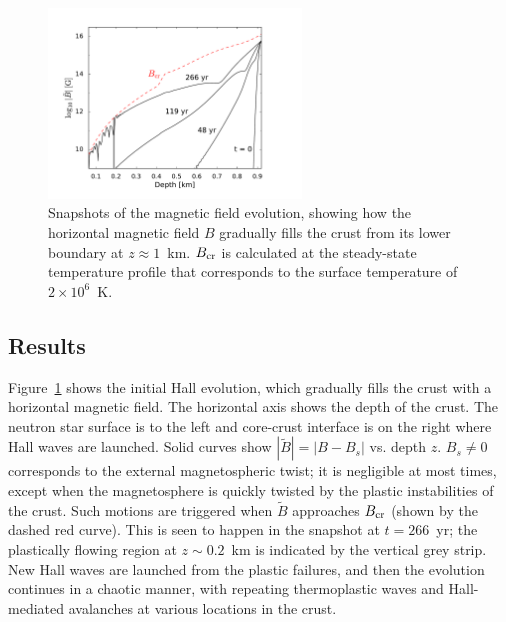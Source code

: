 \begin{figure}[htbp]
\centering
\includegraphics[width=0.6\textwidth]{pics/chap2/fig2.pdf} 
\caption[Snapshots of
the magnetic field evolution]{Snapshots of the magnetic field evolution, showing how the horizontal magnetic field $B$ gradually fills the crust from its lower boundary at $z\approx 1$~km. 
$B_{\rm cr}$ is calculated at the steady-state temperature profile that corresponds to the surface temperature of $2\times 10^{6}$~K.}
\label{hall_evol}
\end{figure}

\subsection{Results}


Figure~\ref{hall_evol} shows the initial Hall evolution, which gradually fills the crust with a horizontal magnetic field. 
The horizontal axis shows the depth of the crust. The neutron star surface is to the left and core-crust interface is on the right where Hall waves are launched.
Solid curves show $|\tilde{B}|=|B-B_s|$ vs. depth $z$. 
$B_s\neq 0$ corresponds to the external magnetospheric twist; it is negligible at most times, except when the magnetosphere is quickly twisted by the plastic 
instabilities of the crust. 
Such motions are triggered when $\tilde{B}$ approaches $B_{\rm cr}$ (shown by the dashed red curve). 
This is seen to happen in the snapshot at $t=266$~yr; the plastically flowing region at $z\sim 0.2$~km is indicated by the vertical grey strip.
New Hall waves are launched from the plastic failures, and then the evolution continues in a chaotic manner, with repeating thermoplastic waves and Hall-mediated avalanches at various locations in the crust.


